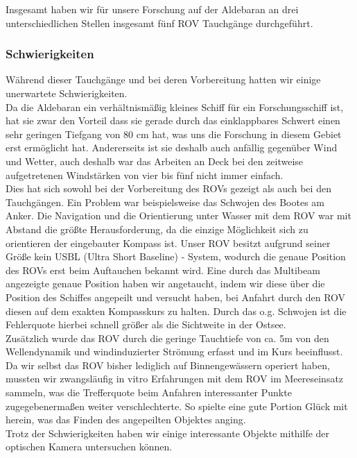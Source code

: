 Insgesamt haben wir für unsere Forschung auf der Aldebaran an drei unterschiedlichen Stellen insgesamt fünf ROV Tauchgänge durchgeführt.
\subsubsection{Schwierigkeiten}
Während dieser Tauchgänge und bei deren Vorbereitung hatten wir einige unerwartete Schwierigkeiten.\\
Da die Aldebaran ein verhältnismäßig kleines Schiff für ein Forschungsschiff ist, hat sie zwar den Vorteil dass sie gerade durch das einklappbares Schwert einen sehr geringen Tiefgang von 80 cm hat, was uns die Forschung in diesem Gebiet erst ermöglicht hat.
Andererseits ist sie deshalb auch anfällig gegenüber Wind und Wetter, auch deshalb war das Arbeiten an Deck bei den zeitweise aufgetretenen Windstärken von vier bis fünf nicht immer einfach.\\
Dies hat sich sowohl bei der Vorbereitung des ROVs gezeigt als auch bei den Tauchgängen. Ein Problem war beispielsweise das Schwojen des Bootes am Anker.
Die Navigation und die Orientierung unter Wasser mit dem ROV war mit Abstand die größte Herausforderung, da die einzige Möglichkeit sich zu orientieren der eingebauter Kompass ist.
Unser ROV besitzt aufgrund seiner Größe kein USBL (Ultra Short Baseline) - System, wodurch die genaue Position des ROVs erst beim Auftauchen bekannt wird.
Eine durch das Multibeam angezeigte genaue Position haben wir angetaucht, indem wir diese über die Position des Schiffes angepeilt und versucht haben, bei Anfahrt durch den ROV diesen auf dem exakten Kompasskurs zu halten.
Durch das o.g. Schwojen ist die Fehlerquote hierbei schnell größer als die Sichtweite in der Ostsee. \\ Zusätzlich wurde das ROV 
durch die geringe Tauchtiefe von ca. 5m von den Wellendynamik und windinduzierter Strömung erfasst und im Kurs beeinflusst. 
Da wir selbst das ROV bisher lediglich auf Binnengewässern operiert haben, mussten wir zwangsläufig in vitro Erfahrungen mit dem ROV im Meereseinsatz sammeln, was die Trefferquote beim Anfahren interessanter Punkte zugegebenermaßen weiter verschlechterte. So spielte eine gute Portion Glück mit herein, was das Finden des angepeilten Objektes anging.\\
Trotz der Schwierigkeiten haben wir einige interessante Objekte mithilfe der optischen Kamera untersuchen können.\\

